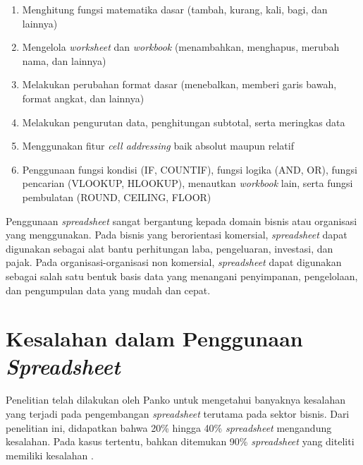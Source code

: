 \begin{enumerate}
    \item Menghitung fungsi matematika dasar (tambah, kurang, kali, bagi, dan lainnya)
    \item Mengelola \textit{worksheet} dan \textit{workbook} (menambahkan, menghapus, merubah nama, dan lainnya)
    \item Melakukan perubahan format dasar (menebalkan, memberi garis bawah, format angkat, dan lainnya)
    \item Melakukan pengurutan data, penghitungan subtotal, serta meringkas data
    \item Menggunakan fitur \textit{cell addressing} baik absolut maupun relatif
    \item Penggunaan fungsi kondisi (IF, COUNTIF), fungsi logika (AND, OR), fungsi pencarian (VLOOKUP, HLOOKUP), menautkan \textit{workbook} lain, serta fungsi pembulatan (ROUND, CEILING, FLOOR)
\end{enumerate}

Penggunaan \textit{spreadsheet} sangat bergantung kepada domain bisnis atau organisasi yang menggunakan. Pada bisnis yang berorientasi komersial, \textit{spreadsheet} dapat digunakan sebagai alat bantu perhitungan laba, pengeluaran, investasi, dan pajak. Pada organisasi-organisasi non komersial, \textit{spreadsheet} dapat digunakan sebagai salah satu bentuk basis data yang menangani penyimpanan, pengelolaan, dan pengumpulan data yang mudah dan cepat.

\section{Kesalahan dalam Penggunaan \textit{Spreadsheet}}
Penelitian telah dilakukan oleh Panko \parencite{Panko1998} untuk mengetahui banyaknya kesalahan yang terjadi pada pengembangan \textit{spreadsheet} terutama pada sektor bisnis. Dari penelitian ini, didapatkan bahwa 20\% hingga 40\% \textit{spreadsheet} mengandung kesalahan. Pada kasus tertentu, bahkan ditemukan 90\% \textit{spreadsheet} yang diteliti memiliki kesalahan \parencite{Journal1996}. 

